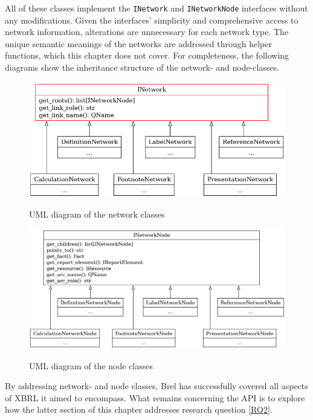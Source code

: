 All of these classes implement the \texttt{INetwork} and \texttt{INetworkNode} interfaces without any modifications.
Given the interfaces' simplicity and comprehensive access to network information,
alterations are unnecessary for each network type.
The unique semantic meanings of the networks are addressed through helper functions, which this chapter does not cover.
For completeness, the following diagrams show the inheritance structure of the network- and node-classes.

\begin{figure}[H]
    \centering
    \caption{UML diagram of the network classes}
    \includegraphics[width=\textwidth]{images/brel_network_classes.png}
    \label{fig:brel_network_classes}
\end{figure}

\begin{figure}[H]
    \centering
    \caption{UML diagram of the node classes}
    \includegraphics[width=\textwidth]{images/brel_network_node_classes.png}
    \label{fig:brel_network_node_classes}
\end{figure}

By addressing network- and node classes, Brel has successfully covered all aspects of XBRL it aimed to encompass.
What remains concerning the API is to explore how the latter section of this chapter addresses research question \ref{RQ2}.
